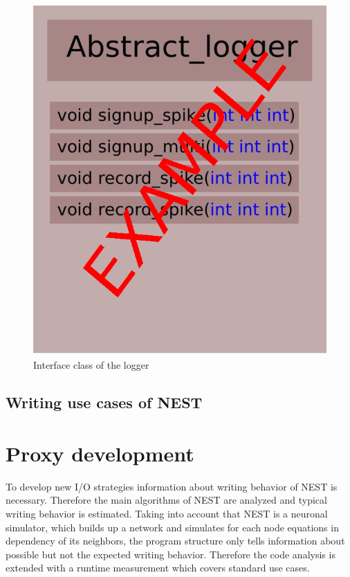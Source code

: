 \documentclass[]{YIC2015}
\begin{document}
\begin{figure}[htbp]
\centering %
\includegraphics[scale=0.5]{loggerinterface.eps}
\caption{Interface class of the logger}
\label{fig:loggerinterface}
\end{figure}


\subsection{Writing use cases of NEST}


\section{Proxy development}
To develop new I/O strategies information about writing behavior of NEST is necessary.
Therefore the main algorithms of NEST are analyzed and typical writing behavior is estimated.
Taking into account that NEST is a neuronal simulator,
which builds up a network and simulates for each  node equations in dependency of its neighbors,
the program structure only tells information about possible but not the expected writing behavior.
Therefore the code analysis is extended with a runtime measurement which covers standard use cases.
\end{document}
